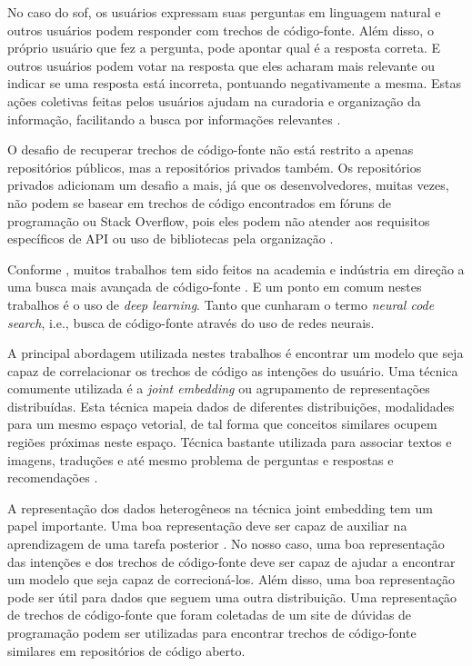 No caso do \Gls{sof}, os usuários expressam suas perguntas em linguagem natural e outros usuários podem responder com trechos de código-fonte. Além disso, o próprio usuário que fez a pergunta, pode apontar qual é a resposta correta. E outros usuários podem votar na resposta que eles acharam mais relevante ou indicar se uma resposta está incorreta, pontuando negativamente a mesma. Estas ações coletivas feitas pelos usuários ajudam na curadoria e organização da informação, facilitando a busca por informações relevantes \citep{Wang-quora:2013, cambronero-deep-learning-code-search:2019}. 

O desafio de recuperar trechos de código-fonte não está restrito a apenas repositórios públicos, mas a repositórios privados também. Os repositórios privados adicionam um desafio a mais, já que os desenvolvedores, muitas vezes, não podem se basear em trechos de código encontrados em fóruns de programação ou Stack Overflow, pois eles podem não atender aos requisitos específicos de API ou uso de bibliotecas pela organização \citep{cambronero-deep-learning-code-search:2019}.

Conforme \cite{cambronero-deep-learning-code-search:2019}, muitos trabalhos tem sido feitos na academia e indústria em direção a uma busca mais avançada de código-fonte \citep{Gu-deep-code-search:2018, yao-2018, iyer-etal-2016-summarizing, Allamanis-bimodal-source-code-natural-language:2015, Chen-bi-variational-autoencoder:2018, Sachdev-neural-code-search:2018, cambronero-deep-learning-code-search:2019}. E um ponto em comum nestes trabalhos é o uso de \textit{deep learning}. Tanto que \cite{cambronero-deep-learning-code-search:2019} cunharam o termo \textit{neural code search}, i.e., busca de código-fonte através do uso de redes neurais. 

A principal abordagem utilizada nestes trabalhos é encontrar um \gls{modelo} que seja capaz de correlacionar os trechos de código as intenções do usuário. Uma técnica comumente utilizada é a \textit{joint embedding} ou agrupamento de representações distribuídas. Esta técnica mapeia dados de diferentes distribuições, modalidades para um mesmo espaço vetorial, de tal forma que conceitos similares ocupem regiões próximas neste espaço. Técnica bastante utilizada para associar textos e imagens, traduções e até mesmo problema de perguntas e respostas e recomendações \citep{lai-etal-2018-review, Zhang:2019:deep-learning-recommender-survey}.

A representação dos dados heterogêneos na técnica joint embedding tem um papel importante. Uma boa representação deve ser capaz de auxiliar na aprendizagem de uma tarefa
posterior \citep{Goodfellow-et-al-2016:representation-learning}. No nosso caso, uma boa representação das intenções e dos trechos de código-fonte deve ser capaz de ajudar a encontrar um modelo que seja capaz de correcioná-los. Além disso, uma boa representação pode ser útil para dados que seguem uma outra distribuição. Uma representação de trechos de código-fonte que foram coletadas de um site de dúvidas de programação podem ser utilizadas para encontrar trechos de código-fonte similares em repositórios de código aberto.

